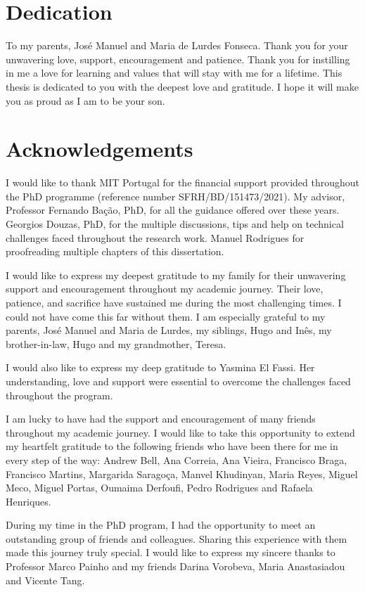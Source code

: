 \chapter*{Dedication}

To my parents, José Manuel and Maria de Lurdes Fonseca. Thank you for your
unwavering love, support, encouragement and patience. Thank you for instilling
in me a love for learning and values that will stay with me for a lifetime.
This thesis is dedicated to you with the deepest love and gratitude.  I hope
it will make you as proud as I am to be your son.

\chapter*{Acknowledgements}

I would like to thank MIT Portugal for the financial support provided
throughout the PhD programme (reference number SFRH/BD/151473/2021). My
advisor, Professor Fernando Bação, PhD, for all the guidance offered over
these years. Georgios Douzas, PhD, for the multiple discussions, tips and help
on technical challenges faced throughout the research work. Manuel Rodrigues
for proofreading multiple chapters of this dissertation.

I would like to express my deepest gratitude to my family for their unwavering
support and encouragement throughout my academic journey. Their love,
patience, and sacrifice have sustained me during the most challenging times. I
could not have come this far without them. I am especially grateful to my
parents, José Manuel and Maria de Lurdes, my siblings, Hugo and Inês, my
brother-in-law, Hugo and my grandmother, Teresa. 

I would also like to express my deep gratitude to Yasmina El Fassi. Her
understanding, love and support were essential to overcome the 
challenges faced throughout the program.

I am lucky to have had the support and encouragement of many friends
throughout my academic journey. I would like to take this opportunity to
extend my heartfelt gratitude to the following friends who have been there for
me in every step of the way: Andrew Bell, Ana Correia, Ana Vieira, Francisco
Braga, Francisco Martins, Margarida Saragoça, Manvel Khudinyan, Maria Reyes,
Miguel Meco, Miguel Portas, Oumaima Derfoufi, Pedro Rodrigues and Rafaela
Henriques.

During my time in the PhD program, I had the opportunity to meet an
outstanding group of friends and colleagues. Sharing this experience with them
made this journey truly special. I would like to express my sincere thanks to
Professor Marco Painho and my friends Darina Vorobeva, Maria Anastasiadou and
Vicente Tang.

